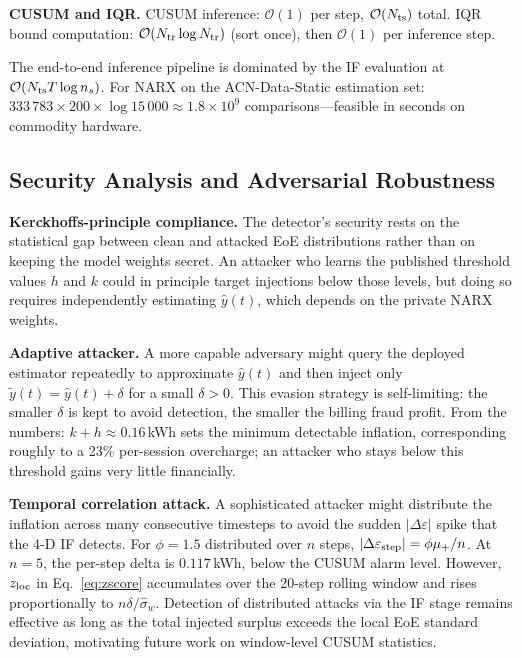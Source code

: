 \documentclass[journal]{IEEEtran}
\begin{document}
\textbf{CUSUM and IQR.}
CUSUM inference: $\mathcal{O}(1)$ per step, $\mathcal{O}(N_{\rm ts})$
total.
IQR bound computation: $\mathcal{O}(N_{\rm tr}\log N_{\rm tr})$
(sort once), then $\mathcal{O}(1)$ per inference step.

The end-to-end inference pipeline is dominated by the IF
evaluation at $\mathcal{O}(N_{\rm ts} T \log n_s)$.
For NARX on the ACN-Data-Static estimation set:
$333\,783 \times 200 \times \log 15\,000 \approx 1.8\times10^9$
comparisons---feasible in seconds on commodity hardware.

\subsection{Security Analysis and Adversarial Robustness}
\label{sec:security}

\textbf{Kerckhoffs-principle compliance.}
The detector's security rests on the statistical gap between
clean and attacked EoE distributions rather than on keeping
the model weights secret.
An attacker who learns the published threshold values $h$ and $k$
could in principle target injections below those levels, but
doing so requires independently estimating $\hat{y}(t)$, which
depends on the private NARX weights.

\textbf{Adaptive attacker.}
A more capable adversary might query the deployed estimator
repeatedly to approximate $\hat{y}(t)$ and then inject only
$\tilde{y}(t)=\hat{y}(t)+\delta$ for a small $\delta>0$.
This evasion strategy is self-limiting: the smaller $\delta$ is
kept to avoid detection, the smaller the billing fraud profit.
From the numbers: $k+h\approx0.16$\,kWh sets the minimum
detectable inflation, corresponding roughly to a 23\%
per-session overcharge; an attacker who stays below this
threshold gains very little financially.

\textbf{Temporal correlation attack.}
A sophisticated attacker might distribute the inflation across
many consecutive timesteps to avoid the sudden $|\Delta\varepsilon|$
spike that the 4-D IF detects.
For $\phi=1.5$ distributed over $n$ steps,
$|\Delta\varepsilon_{\rm step}| = \phi\mu_+/n$.
At $n=5$, the per-step delta is $0.117$\,kWh, below the CUSUM
alarm level. However, $z_{\rm loc}$ in Eq.~\eqref{eq:zscore}
accumulates over the 20-step rolling window and rises
proportionally to $n\delta/\hat{\sigma}_w$.
Detection of distributed attacks via the IF stage remains
effective as long as the total injected surplus exceeds the
local EoE standard deviation, motivating future work on
window-level CUSUM statistics.
\end{document}
